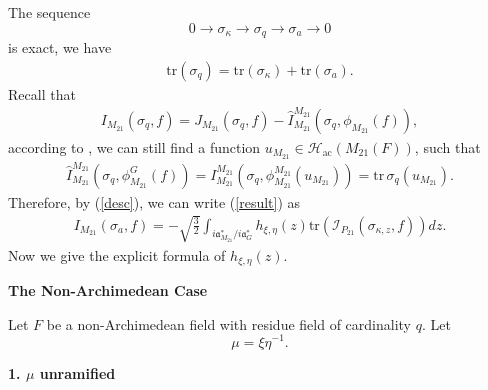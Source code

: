 \documentclass[11pt]{amsart}
\renewcommand{\rm}{\mathrm}
\theoremstyle{definition}
\numberwithin{equation}{section}
\begin{document}
	The sequence \[0 \longrightarrow \sigma_\kappa \longrightarrow \sigma_q \longrightarrow \sigma_a \longrightarrow 0\] is exact, we have
	\begin{align}\label{exact}
		\mathrm{tr}(\sigma_q)=\mathrm{tr}(\sigma_\kappa)+\mathrm{tr}(\sigma_a). 
	\end{align} 
	Recall that
	\begin{align}\label{desc}
		I_{M_{21}}(\sigma_q,f)=J_{M_{21}}(\sigma_q,f)-\hat{I}_{M_{21}}^{M_{21}}(\sigma_q,\phi_{M_{21}}(f)),
	\end{align} according to \cite{Art88(1)}, we can still find a function \(u_{M_{21}}\in\mathscr{H}_{\rm{ac}}(M_{21}(F))\), such that
	\begin{align}\label{surj}
		\hat{I}^{M_{21}}_{M_{21}}(\sigma_q,\phi^G_{M_{21}}(f))=I^{M_{21}}_{M_{21}}(\sigma_q,\phi^{M_{21}}_{M_{21}}(u_{M_{21}}))=\rm{tr}\,\sigma_q(u_{M_{21}}).
	\end{align}
	Therefore, by (\ref{desc}),  we can write (\ref{result}) as 
	\begin{align}
		I_{M_{21}}(\sigma_a,f)=-\sqrt{\frac{3}{2}}\int_{i\mathfrak{a}_{M_{21}}^*/i\mathfrak{a}_G^*}h_{\xi,\eta}(z)\rm{tr}(\mathscr{I}_{P_{21}}(\sigma_{\kappa,z},f))dz.
	\end{align}
	Now we give the explicit formula of \(h_{\xi,\eta}(z)\).
	
	
	
	
	\textbf{The Non-Archimedean Case}
	
	Let \(F\) be a non-Archimedean field with residue field of cardinality \(q\). Let
	\[
	\mu = \xi \eta^{-1}.
	\]
	
	\textbf{1. \(\mu\) unramified}
	
\end{document}
